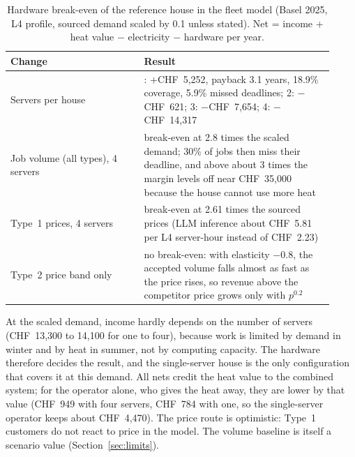 \begin{table}[ht]
  \centering
  \caption{Hardware break-even of the reference house in the fleet model (Basel 2025, L4 profile,
    sourced demand scaled by 0.1 unless stated). Net = income + heat value $-$ electricity $-$
    hardware per year.}
  \label{tab:breakeven}
  \begin{tabular}{>{\raggedright\arraybackslash}p{0.38\linewidth}>{\raggedright\arraybackslash}p{0.54\linewidth}}
    \toprule
    Change & Result \\
    \midrule
    Servers per house & 1: $+$CHF~5,252, payback 3.1 years, 18.9\% coverage, 5.9\% missed deadlines;
      2: $-$CHF~621; 3: $-$CHF~7,654; 4: $-$CHF~14,317 \\
    Job volume (all types), 4 servers & break-even at 2.8 times the scaled demand; 30\% of jobs then
      miss their deadline, and above about 3 times the margin levels off near CHF~35,000 because the
      house cannot use more heat \\
    Type~1 prices, 4 servers & break-even at 2.61 times the sourced prices (LLM inference about
      CHF~5.81 per L4 server-hour instead of CHF~2.23) \\
    Type~2 price band only & no break-even: with elasticity $-0.8$, the accepted volume falls almost
      as fast as the price rises, so revenue above the competitor price grows only with $p^{0.2}$ \\
    \bottomrule
  \end{tabular}
\end{table}

At the scaled demand, income hardly depends on the number of servers (CHF~13,300 to 14,100 for one
to four), because work is limited by demand in winter and by heat in summer, not by computing
capacity. The hardware therefore decides the result, and the single-server house is the only
configuration that covers it at this demand. All nets credit the heat value to the combined system; for the operator alone,
who gives the heat away, they are lower by that value (CHF~949 with four servers, CHF~784 with one,
so the single-server operator keeps about CHF~4,470). The price route is optimistic: Type~1
customers do not react to price in the model. The volume baseline is itself a scenario value (Section~\ref{sec:limits}).

